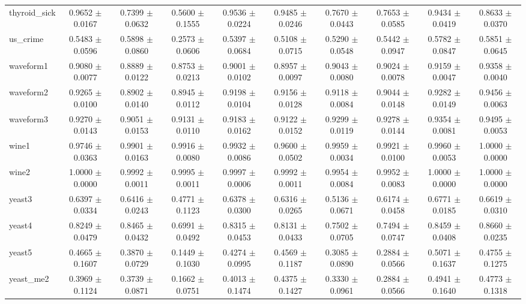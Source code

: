 \begin{table*}[htbp]
\begin{tabular}{lccccccccc}
            thyroid\_sick & 0.9652 $\pm$ 0.0167 & 0.7399 $\pm$ 0.0632 & 0.5600 $\pm$ 0.1555 & 0.9536 $\pm$ 0.0224 & 0.9485 $\pm$ 0.0246 & 0.7670 $\pm$ 0.0443 & 0.7653 $\pm$ 0.0585 & 0.9434 $\pm$ 0.0419 & 0.8633 $\pm$ 0.0370 \\ 
            us\_crime & 0.5483 $\pm$ 0.0596 & 0.5898 $\pm$ 0.0860 & 0.2573 $\pm$ 0.0606 & 0.5397 $\pm$ 0.0684 & 0.5108 $\pm$ 0.0715 & 0.5290 $\pm$ 0.0548 & 0.5442 $\pm$ 0.0947 & 0.5782 $\pm$ 0.0847 & 0.5851 $\pm$ 0.0645 \\ 
            waveform1 & 0.9080 $\pm$ 0.0077 & 0.8889 $\pm$ 0.0122 & 0.8753 $\pm$ 0.0213 & 0.9001 $\pm$ 0.0102 & 0.8957 $\pm$ 0.0097 & 0.9043 $\pm$ 0.0080 & 0.9024 $\pm$ 0.0078 & 0.9159 $\pm$ 0.0047 & 0.9358 $\pm$ 0.0040 \\ 
            waveform2 & 0.9265 $\pm$ 0.0100 & 0.8902 $\pm$ 0.0140 & 0.8945 $\pm$ 0.0112 & 0.9198 $\pm$ 0.0104 & 0.9156 $\pm$ 0.0128 & 0.9118 $\pm$ 0.0084 & 0.9044 $\pm$ 0.0148 & 0.9282 $\pm$ 0.0149 & 0.9456 $\pm$ 0.0063 \\ 
            waveform3 & 0.9270 $\pm$ 0.0143 & 0.9051 $\pm$ 0.0153 & 0.9131 $\pm$ 0.0110 & 0.9183 $\pm$ 0.0162 & 0.9122 $\pm$ 0.0152 & 0.9299 $\pm$ 0.0119 & 0.9278 $\pm$ 0.0144 & 0.9354 $\pm$ 0.0081 & 0.9495 $\pm$ 0.0053 \\ 
            wine1 & 0.9746 $\pm$ 0.0363 & 0.9901 $\pm$ 0.0163 & 0.9916 $\pm$ 0.0080 & 0.9932 $\pm$ 0.0086 & 0.9600 $\pm$ 0.0502 & 0.9959 $\pm$ 0.0034 & 0.9921 $\pm$ 0.0100 & 0.9960 $\pm$ 0.0053 & 1.0000 $\pm$ 0.0000 \\ 
            wine2 & 1.0000 $\pm$ 0.0000 & 0.9992 $\pm$ 0.0011 & 0.9995 $\pm$ 0.0011 & 0.9997 $\pm$ 0.0006 & 0.9992 $\pm$ 0.0011 & 0.9954 $\pm$ 0.0084 & 0.9952 $\pm$ 0.0083 & 1.0000 $\pm$ 0.0000 & 1.0000 $\pm$ 0.0000 \\ 
            yeast3 & 0.6397 $\pm$ 0.0334 & 0.6416 $\pm$ 0.0243 & 0.4771 $\pm$ 0.1123 & 0.6378 $\pm$ 0.0300 & 0.6316 $\pm$ 0.0265 & 0.5136 $\pm$ 0.0671 & 0.6174 $\pm$ 0.0458 & 0.6771 $\pm$ 0.0185 & 0.6619 $\pm$ 0.0310 \\ 
            yeast4 & 0.8249 $\pm$ 0.0479 & 0.8465 $\pm$ 0.0432 & 0.6991 $\pm$ 0.0492 & 0.8315 $\pm$ 0.0453 & 0.8131 $\pm$ 0.0433 & 0.7502 $\pm$ 0.0705 & 0.7494 $\pm$ 0.0747 & 0.8459 $\pm$ 0.0408 & 0.8660 $\pm$ 0.0235 \\ 
            yeast5 & 0.4665 $\pm$ 0.1607 & 0.3870 $\pm$ 0.0729 & 0.1449 $\pm$ 0.1030 & 0.4274 $\pm$ 0.0995 & 0.4569 $\pm$ 0.1187 & 0.3085 $\pm$ 0.0890 & 0.2884 $\pm$ 0.0566 & 0.5071 $\pm$ 0.1637 & 0.4755 $\pm$ 0.1275 \\ 
            yeast\_me2 & 0.3969 $\pm$ 0.1124 & 0.3739 $\pm$ 0.0871 & 0.1662 $\pm$ 0.0751 & 0.4013 $\pm$ 0.1474 & 0.4375 $\pm$ 0.1427 & 0.3330 $\pm$ 0.0961 & 0.2884 $\pm$ 0.0566 & 0.4941 $\pm$ 0.1640 & 0.4773 $\pm$ 0.1318 \\ 
        \bottomrule
    \end{tabular}
\end{table*}
